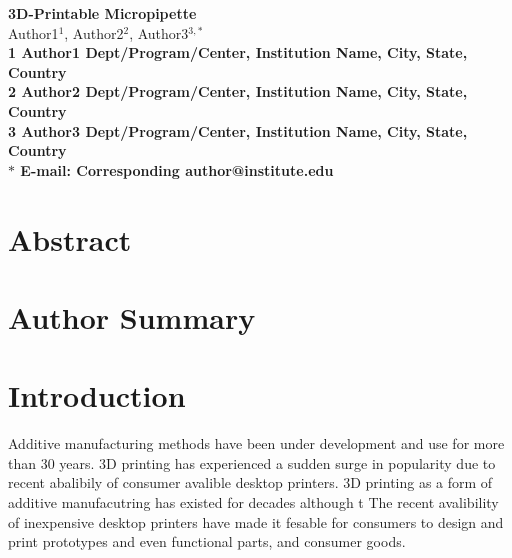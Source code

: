 \pagestyle{myheadings}







\begin{flushleft}
{\Large
\textbf{3D-Printable Micropipette}
}
\\
Author1$^{1}$, 
Author2$^{2}$, 
Author3$^{3,\ast}$
\\
\bf{1} Author1 Dept/Program/Center, Institution Name, City, State, Country
\\
\bf{2} Author2 Dept/Program/Center, Institution Name, City, State, Country
\\
\bf{3} Author3 Dept/Program/Center, Institution Name, City, State, Country
\\
$\ast$ E-mail: Corresponding author@institute.edu
\end{flushleft}

\section*{Abstract}

\section*{Author Summary}



\section*{Introduction}

Additive manufacturing methods have been under development and use for more than 30 years.
3D printing has experienced a sudden surge in popularity due to recent abalibily of consumer avalible desktop printers. 
3D printing as a form of additive manufacutring has existed for decades although t
The recent avalibility of inexpensive desktop printers have made it fesable for consumers to design and print prototypes and even functional parts, and consumer goods.

